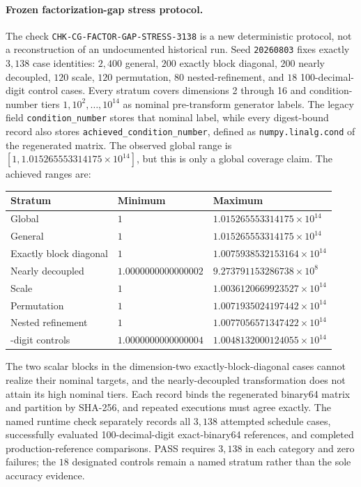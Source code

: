 \paragraph{Frozen factorization-gap stress protocol.}
The check \texttt{CHK-CG-FACTOR-GAP-STRESS-3138} is a new deterministic
protocol, not a reconstruction of an undocumented historical run.  Seed
\texttt{20260803} fixes exactly $3{,}138$ case identities: $2{,}400$ general,
$200$ exactly block diagonal, $200$ nearly decoupled, $120$ scale, $120$
permutation, $80$ nested-refinement, and $18$ 100-decimal-digit control cases.
Every stratum covers dimensions 2 through 16 and condition-number tiers
$1,10^2,\ldots,10^{14}$ as nominal pre-transform generator labels.  The
legacy field \texttt{condition\_number} stores that nominal label, while every
digest-bound record also stores \texttt{achieved\_condition\_number}, defined
as \texttt{numpy.linalg.cond} of the regenerated matrix.  The observed global
range is $[1,1.015265553314175\times10^{14}]$, but this is only a global
coverage claim.  The achieved ranges are:
\begin{center}
\footnotesize
\begin{tabularx}{0.94\textwidth}{@{}>{\raggedright\arraybackslash}X>{\raggedleft\arraybackslash}X>{\raggedleft\arraybackslash}X@{}}
\toprule
Stratum & Minimum & Maximum \\
\midrule
Global & $1$ & $1.015265553314175\times10^{14}$ \\
General & $1$ & $1.015265553314175\times10^{14}$ \\
Exactly block diagonal & $1$ & $1.0075938532153164\times10^{14}$ \\
Nearly decoupled & $1.0000000000000002$ & $9.273791153286738\times10^8$ \\
Scale & $1$ & $1.0036120669923527\times10^{14}$ \\
Permutation & $1$ & $1.0071935024197442\times10^{14}$ \\
Nested refinement & $1$ & $1.0077056571347422\times10^{14}$ \\
100-digit controls & $1.0000000000000004$ & $1.0048132000124055\times10^{14}$ \\
\bottomrule
\end{tabularx}
\normalsize
\end{center}
The two scalar blocks in the dimension-two exactly-block-diagonal cases cannot
realize their nominal targets, and the nearly-decoupled transformation does
not attain its high nominal tiers.  Each record binds the regenerated binary64
matrix and partition by SHA-256, and repeated executions must agree exactly.
The named runtime check separately records all $3{,}138$ attempted schedule
cases, successfully evaluated 100-decimal-digit exact-binary64 references, and
completed production-reference comparisons.  PASS requires $3{,}138$ in each
category and zero failures; the $18$ designated controls remain a named stratum
rather than the sole accuracy evidence. 

